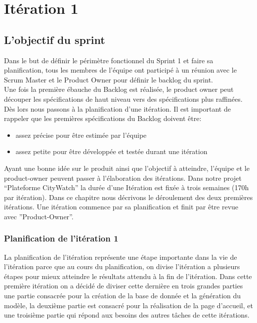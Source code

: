 \section{Itération 1}

\subsection{L'objectif du sprint}

Dans le but de définir le périmètre fonctionnel du Sprint 1 et faire
sa planification, tous les membres de l'équipe ont participé à un réunion
avec le Scrum Master et le Product Owner pour définir le backlog du sprint.\\

Une fois la première ébauche du Backlog est réalisée, le product owner peut découper
les spécifications de haut niveau vers des spécifications plus raffinées. Dès lors nous
passons à la planification d’une itération. Il est important de rappeler que les premières
spécifications du Backlog doivent être:
\begin{itemize}
 \item assez précise pour être estimée par l’équipe
 \item assez petite pour être développée et testée durant une itération
\end{itemize}
Ayant une bonne idée sur le produit ainsi que l’objectif à atteindre, l’équipe et le
product-owner peuvent passer à l’élaboration des itérations.
Dans notre projet ``Plateforme CityWatch'' la durée d’une Itération est fixée à trois
semaines (170h par itération). Dans ce chapitre nous décrivons le déroulement des deux
premières itérations. Une itération commence par sa planification et finit par être revue
avec ”Product-Owner”.

\subsubsection{Planification de l'itération 1}

La planification de l'itération représente une étape importante dans la vie de
l'itération parce que au cours du planification, on divise l'itération a plusieurs étapes
pour mieux atteindre le résultats attendu à la fin de l'itération.
Dans cette première itération on a décidé de diviser cette dernière en trois grandes
parties une partie consacrée pour la création de la base de donnée et la génération du
modèle, la deuxième partie est consacré pour la réalisation de la page d’accueil, et une
troisième partie qui répond aux besoins des autres tâches de cette itérations.

